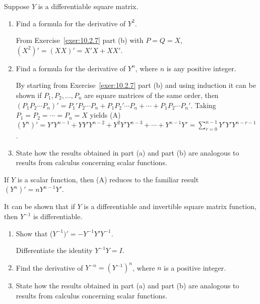 \documentclass{ximera}
\begin{document}
\begin{problem}\label{exer:10.2.10}  Suppose $Y$ is a differentiable square
matrix.
\begin{enumerate}
\item %
Find a formula for the derivative of $Y^2$.

\begin{solution}
    From Exercise~\ref{exer:10.2.7} part (b) with $P=Q=X$,
$(X^2)'=(XX)'=X'X+XX'$.
\end{solution}

\item %
Find a formula for the derivative of $Y^n$, where $n$ is any
positive integer.

\begin{solution}
    By starting from
 Exercise~\ref{exer:10.2.7} part (b) and using induction it can be shown
if $P_1,P_2,\dots,P_n$ are square matrices of the same order, then
 $(P_1P_2\cdots P_n)'=P_1'P_2\cdots P_n+P_1P_2'\cdots P_n+\cdots+
P_1P_2\cdots P_n'$. Taking $P_1=P_2=\cdots=P_n=X$  yields
(A) $(Y^n)'=Y'Y^{n-1}+YY'Y^{n-2}+Y^2Y'Y^{n-3}+\cdots+Y^{n-1}Y'=\sum_{r=0}^{n-1}Y^rY'Y^{n-r-1}$.
\end{solution}

\item %
State how the results obtained in part (a) and part (b) are analogous to
results from  calculus  concerning scalar functions.
\end{enumerate}

\begin{solution}
    If $Y$ is a scalar function, then (A) reduces to
the familiar result $(Y^n)'=nY^{n-1}Y'$.
\end{solution}

\end{problem}

\begin{problem}\label{exer:10.2.11}
It can be shown that if $Y$ is a differentiable and  invertible
square matrix function, then $Y^{-1}$ is differentiable.

\begin{enumerate}
\item %
Show that ($Y^{-1})'=
-Y^{-1}Y'Y^{-1}$.
\begin{hint}
Differentiate the identity $Y^{-1}Y=I$.
\end{hint}
\item %
Find the derivative of $Y^{-n}=\left(Y^{-1}\right)^n$, where $n$
is a positive integer.
\item %
State how the results obtained in part (a) and part (b) are analogous to
results from  calculus  concerning scalar functions.
\end{enumerate}
\end{problem}
\end{document}
